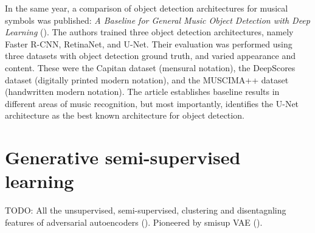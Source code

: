 In the same year, a comparison of object detection architectures for musical symbols was published: \emph{A Baseline for General Music Object Detection with Deep Learning} (\cite{PachaBaseline}). The authors trained three object detection architectures, namely Faster R-CNN, RetinaNet, and U-Net. Their evaluation was performed using three datasets with object detection ground truth, and varied appearance and content. These were the Capitan dataset (mensural notation), the DeepScores dataset (digitally printed modern notation), and the MUSCIMA++ dataset (handwritten modern notation). The article establishes baseline results in different areas of music recognition, but most importantly, identifies the U-Net architecture as the best known architecture for object detection.


\section{Generative semi-supervised learning}

TODO: All the unsupervised, semi-supervised, clustering and disentagnling features of adversarial autoencoders (\cite{AdversarialAutoencoders}). Pioneered by smisup VAE (\cite{KingmaSslVae}).

